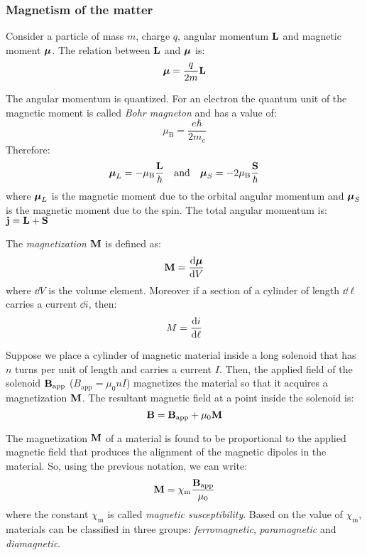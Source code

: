 \documentclass[../../../main.tex]{subfiles}
\begin{document}
\begin{multicols}{2}
  \subsubsection*{Magnetism of the matter}
  \begin{prop}
    Consider a particle of mass $m$, charge $q$, angular momentum $\vb{L}$ and magnetic moment $\vb*{\mu}$. The relation between $\vb{L}$ and $\vb*{\mu}$ is: $$\vb*{\mu}=\frac{q}{2m}\vb{L}$$
  \end{prop}
  \begin{prop}
    The angular momentum is quantized. For an electron the quantum unit of the magnetic moment is called \textit{Bohr magneton} and has a value of: $$\mu_\text{B}=\frac{e\hbar}{2m_e}$$ Therefore: $$\vb*{\mu}_L=-\mu_\text{B}\frac{\vb{L}}{\hbar}\quad\text{and}\quad\vb*{\mu}_S=-2\mu_\text{B}\frac{\vb{S}}{\hbar}$$ where $\vb*{\mu}_L$ is the magnetic moment due to the orbital angular momentum and $\vb*{\mu}_S$ is the magnetic moment due to the spin. The total angular momentum is: $\vb{j}=\vb{L}+\vb{S}$
  \end{prop}
  \begin{definition}
    The \textit{magnetization $\vb{M}$} is defined as: $$\vb{M}=\dv{\vb*{\mu}}{V}$$ where $\dd V$ is the volume element. Moreover if a section of a cylinder of length $\dd\ell$ carries a current $\dd i$, then: $$M=\dv{i}{\ell}$$
  \end{definition}
  \begin{prop}
    Suppose we place a cylinder of magnetic material inside a long solenoid that has $n$ turns per unit of length and carries a current $I$. Then, the applied field of the solenoid $\vb{B}_\text{app}$ ($B_\text{app}=\mu_0nI$) magnetizes the material so that it acquires a magnetization $\vb{M}$. The resultant magnetic field at a point inside the solenoid is: $$\vb{B}=\vb{B}_\text{app}+\mu_0\vb{M}$$
  \end{prop}
  \begin{prop}
    The magnetization $\vb{M}$ of a material is found to be proportional to the applied magnetic field that produces the alignment of the magnetic dipoles in the material. So, using the previous notation, we can write: $$\vb{M}=\chi_\text{m}\frac{\vb{B}_\text{app}}{\mu_0}$$ where the constant $\chi_\text{m}$ is called \textit{magnetic susceptibility}. Based on the value of $\chi_\text{m}$, materials can be classified in three groups: \textit{ferromagnetic}, \textit{paramagnetic} and \textit{diamagnetic}.

\end{prop}
\end{multicols}
\end{document}
